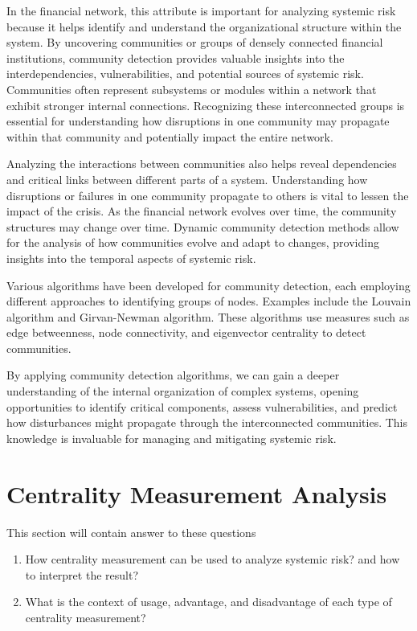 \documentclass[a4paper,11pt]{article}
\begin{document}
In the financial network, this attribute is important for analyzing systemic risk because it helps identify and understand the organizational structure within the system. By uncovering communities or groups of densely connected financial institutions, community detection provides valuable insights into the interdependencies, vulnerabilities, and potential sources of systemic risk. Communities often represent subsystems or modules within a network that exhibit stronger internal connections. Recognizing these interconnected groups is essential for understanding how disruptions in one community may propagate within that community and potentially impact the entire network.

Analyzing the interactions between communities also helps reveal dependencies and critical links between different parts of a system. Understanding how disruptions or failures in one community propagate to others is vital to lessen the impact of the crisis. As the financial network evolves over time, the community structures may change over time. Dynamic community detection methods allow for the analysis of how communities evolve and adapt to changes, providing insights into the temporal aspects of systemic risk.

Various algorithms have been developed for community detection, each employing different approaches to identifying groups of nodes. Examples include the Louvain algorithm and Girvan-Newman algorithm. These algorithms use measures such as edge betweenness, node connectivity, and eigenvector centrality to detect communities.

By applying community detection algorithms, we can gain a deeper understanding of the internal organization of complex systems, opening opportunities to identify critical components, assess vulnerabilities, and predict how disturbances might propagate through the interconnected communities. This knowledge is invaluable for managing and mitigating systemic risk.



\section{Centrality Measurement Analysis}
This section will contain answer to these questions
\begin{enumerate}
    \item How centrality measurement can be used to analyze systemic risk? and how to interpret the result?
    \item What is the context of usage, advantage, and disadvantage of each type of centrality measurement?
\end{enumerate}
\end{document}
